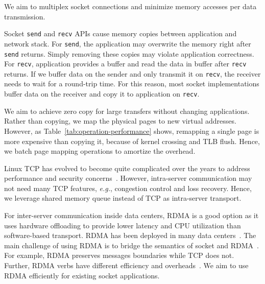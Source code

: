 We aim to multiplex socket connections and minimize memory accesses per data transmission.


Socket \texttt{send} and \texttt{recv} APIs cause memory copies between application and network stack. For \texttt{send}, the application may overwrite the memory right after \texttt{send} returns. Simply removing these copies may violate application correctness. For \texttt{recv}, application provides a buffer and read the data in buffer after \texttt{recv} returns. If we buffer data on the sender and only transmit it on \texttt{recv}, the receiver needs to wait for a round-trip time. For this reason, most socket implementations buffer data on the receiver and copy it to application on \texttt{recv}.


We aim to achieve zero copy for large transfers without changing applications. Rather than copying, we map the physical pages to new virtual addresses. However, as Table~\ref{tab:operation-performance} shows, remapping a single page is more expensive than copying it, because of kernel crossing and TLB flush. Hence, we batch page mapping operations to amortize the overhead.



Linux TCP has evolved to become quite complicated over the years to address performance and security concerns~\cite{yasukata2016stackmap}. However, intra-server communication may not need many TCP features, \textit{e.g.}, congestion control and loss recovery. Hence, we leverage shared memory queue instead of TCP as intra-server transport.%


For inter-server communication inside data centers, RDMA is a good option as it uses hardware offloading to provide lower latency and CPU utilization than software-based transport. RDMA has been deployed in many data centers~\cite{guo2016rdma}. The main challenge of using RDMA is to bridge the semantics of socket and RDMA~\cite{dragojevic2014farm}. For example, RDMA preserves messages boundaries while TCP does not. Further, RDMA verbs have different efficiency and overheads~\cite{kalia2014using,kaminsky2016design}. We aim to use RDMA efficiently for existing socket applications. 


